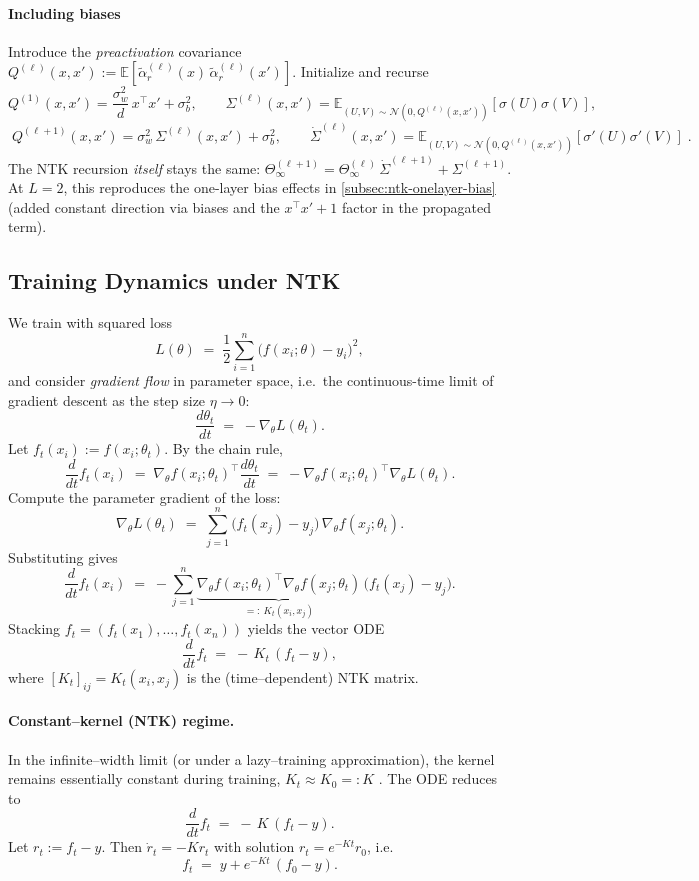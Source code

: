 \paragraph{Including biases}

Introduce the \emph{preactivation} covariance
$Q^{(\ell)}(x,x'):=\mathbb E[\tilde\alpha^{(\ell)}_r(x)\,\tilde\alpha^{(\ell)}_r(x')]$.
Initialize and recurse
\[
	Q^{(1)}(x,x')=\frac{\sigma_w^2}{d}\,x^\top x' + \sigma_b^2,\qquad
	\Sigma^{(\ell)}(x,x')=\mathbb E_{(U,V)\sim\mathcal N(0,Q^{(\ell)}(x,x'))}\![\sigma(U)\sigma(V)],
\]
\[
	\boxed{\;Q^{(\ell+1)}(x,x')=\sigma_w^2\,\Sigma^{(\ell)}(x,x')+\sigma_b^2,\qquad
	\dot\Sigma^{(\ell)}(x,x')=\mathbb E_{(U,V)\sim\mathcal N(0,Q^{(\ell)}(x,x'))}\![\sigma'(U)\sigma'(V)]\; }.
\]
The NTK recursion \emph{itself} stays the same:
$\Theta_\infty^{(\ell+1)}=\Theta_\infty^{(\ell)}\,\dot\Sigma^{(\ell+1)}+\Sigma^{(\ell+1)}$.
At $L=2$, this reproduces the one-layer bias effects in \autoref{subsec:ntk-onelayer-bias}
(added constant direction via biases and the $x^\top x' + 1$ factor in the propagated term).

\subsection{Training Dynamics under NTK}

We train with squared loss
\[
	L(\theta)\;=\;\frac{1}{2}\sum_{i=1}^n \big(f(x_i;\theta)-y_i\big)^2,
\]
and consider \emph{gradient flow} in parameter space, i.e.\ the continuous-time limit
of gradient descent as the step size $\eta \to 0$:
\[
	\frac{d\theta_t}{dt}\;=\;-\nabla_\theta L(\theta_t).
\]
Let $f_t(x_i):=f(x_i;\theta_t)$. By the chain rule,
\[
	\frac{d}{dt} f_t(x_i)
	\;=\;\nabla_\theta f(x_i;\theta_t)^\top \frac{d\theta_t}{dt}
	\;=\;-\nabla_\theta f(x_i;\theta_t)^\top \nabla_\theta L(\theta_t).
\]
Compute the parameter gradient of the loss:
\[
	\nabla_\theta L(\theta_t)\;=\;\sum_{j=1}^n \big(f_t(x_j)-y_j\big)\,\nabla_\theta f(x_j;\theta_t).
\]
Substituting gives
\[
	\frac{d}{dt} f_t(x_i)
	\;=\;-\sum_{j=1}^n \underbrace{\nabla_\theta f(x_i;\theta_t)^\top \nabla_\theta f(x_j;\theta_t)}_{=:~K_t(x_i,x_j)}\,
	\big(f_t(x_j)-y_j\big).
\]
Stacking $f_t=(f_t(x_1),\dots,f_t(x_n))$ yields the vector ODE
\[
	\frac{d}{dt} f_t \;=\; -\,K_t\,(f_t - y),
\]
where $[K_t]_{ij}=K_t(x_i,x_j)$ is the (time–dependent) NTK matrix.

\paragraph{Constant–kernel (NTK) regime.}
In the infinite–width limit (or under a lazy–training approximation), the
kernel remains essentially constant during training, $K_t \approx K_0=:K$ \citep{jacot2018ntk}. The
ODE reduces to
\[
	\frac{d}{dt} f_t \;=\; -\,K\,(f_t - y).
\]
Let $r_t:=f_t-y$. Then $\dot r_t=-Kr_t$ with solution $r_t=e^{-Kt}r_0$, i.e.
\[
	f_t \;=\; y + e^{-Kt}\,(f_0-y).
\]

